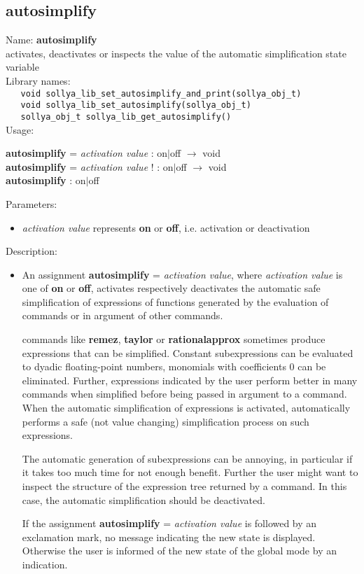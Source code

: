 \subsection{autosimplify}
\label{labautosimplify}
\noindent Name: \textbf{autosimplify}\\
\phantom{aaa}activates, deactivates or inspects the value of the automatic simplification state variable\\[0.2cm]
\noindent Library names:\\
\verb|   void sollya_lib_set_autosimplify_and_print(sollya_obj_t)|\\
\verb|   void sollya_lib_set_autosimplify(sollya_obj_t)|\\
\verb|   sollya_obj_t sollya_lib_get_autosimplify()|\\[0.2cm]
\noindent Usage: 
\begin{center}
\textbf{autosimplify} = \emph{activation value} : \textsf{on$|$off} $\rightarrow$ \textsf{void}\\
\textbf{autosimplify} = \emph{activation value} ! : \textsf{on$|$off} $\rightarrow$ \textsf{void}\\
\textbf{autosimplify} : \textsf{on$|$off}\\
\end{center}
Parameters: 
\begin{itemize}
\item \emph{activation value} represents \textbf{on} or \textbf{off}, i.e. activation or deactivation
\end{itemize}
\noindent Description: \begin{itemize}

\item An assignment \textbf{autosimplify} = \emph{activation value}, where \emph{activation value}
   is one of \textbf{on} or \textbf{off}, activates respectively deactivates the
   automatic safe simplification of expressions of functions generated by
   the evaluation of commands or in argument of other commands.
    
   \sollya commands like \textbf{remez}, \textbf{taylor} or \textbf{rationalapprox} sometimes
   produce expressions that can be simplified. Constant subexpressions
   can be evaluated to dyadic floating-point numbers, monomials with
   coefficients $0$ can be eliminated. Further, expressions
   indicated by the user perform better in many commands when simplified
   before being passed in argument to a command. When the automatic
   simplification of expressions is activated, \sollya automatically
   performs a safe (not value changing) simplification process on such
   expressions.
    
   The automatic generation of subexpressions can be annoying, in
   particular if it takes too much time for not enough benefit. Further the
   user might want to inspect the structure of the expression tree
   returned by a command. In this case, the automatic simplification
   should be deactivated.
    
   If the assignment \textbf{autosimplify} = \emph{activation value} is followed by an
   exclamation mark, no message indicating the new state is
   displayed. Otherwise the user is informed of the new state of the
   global mode by an indication.
\end{itemize}
